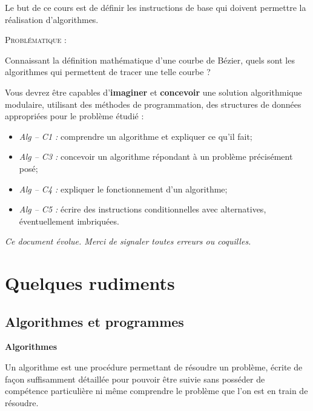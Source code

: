 \documentclass[10pt]{article}
\begin{document}
Le but de ce cours est de définir les instructions de base qui doivent permettre la réalisation d'algorithmes. 


\begin{prob}
\textsc{Problématique :}

Connaissant la définition mathématique d'une courbe de Bézier, quels sont les algorithmes qui permettent de tracer une telle courbe ?
\end{prob}


\begin{comp}
Vous devrez être capables d'\textbf{imaginer} et \textbf{concevoir} une solution algorithmique modulaire, utilisant des méthodes de programmation, des structures de données appropriées pour le problème étudié :
\begin{itemize}
\item \textit{Alg -- C1 :} comprendre un algorithme et expliquer ce qu’il fait;
\item \textit{Alg -- C3 :} concevoir un algorithme répondant à un problème précisément posé;
\item \textit{Alg -- C4 :} expliquer le fonctionnement d’un algorithme;
\item \textit{Alg -- C5 :} écrire des instructions conditionnelles avec alternatives, éventuellement imbriquées.
\end{itemize}
\end{comp}
 

\setlength{\parskip}{0ex plus 0.2ex minus 0ex}
 \renewcommand{\contentsname}{}
 \renewcommand{\baselinestretch}{1}

\tableofcontents

 \renewcommand{\baselinestretch}{1.2}
\setlength{\parskip}{2ex plus 0.5ex minus 0.2ex}

\textit{Ce document évolue. Merci de signaler toutes erreurs ou coquilles.}


\section{Quelques rudiments}

\subsection{Algorithmes et programmes \cite{wack}}
\begin{defi}
\textbf{Algorithmes}

Un algorithme est une procédure permettant de résoudre un problème, écrite de façon
suffisamment détaillée pour pouvoir être suivie sans posséder de compétence particulière
ni même comprendre le problème que l’on est en train de résoudre.
\end{defi}
\end{document}
